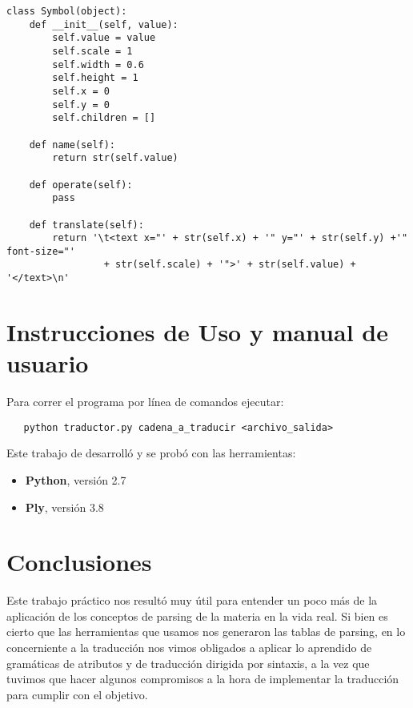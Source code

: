 \begin{verbatim}
class Symbol(object):
    def __init__(self, value):
        self.value = value
        self.scale = 1
        self.width = 0.6
        self.height = 1
        self.x = 0
        self.y = 0
        self.children = []

    def name(self):
        return str(self.value)

    def operate(self):
        pass

    def translate(self):
        return '\t<text x="' + str(self.x) + '" y="' + str(self.y) +'" font-size="' 
                 + str(self.scale) + '">' + str(self.value) + '</text>\n'
\end{verbatim}


\newpage

\section{Instrucciones de Uso y manual de usuario}

\indent \indent Para correr el programa por línea de comandos ejecutar:\\
\begin{verbatim}
   python traductor.py cadena_a_traducir <archivo_salida>
\end{verbatim}

\indent Este trabajo de desarrolló y se probó con las herramientas:
\begin{itemize}
\item \textbf{Python}, versión 2.7
\item \textbf{Ply}, versión 3.8
\end{itemize}

\section{Conclusiones}

\indent Este trabajo práctico nos resultó muy útil para entender un poco más de la aplicación de los conceptos de parsing de la materia en la vida real. Si bien es cierto que las herramientas que usamos nos generaron las tablas de parsing, en lo concerniente a la traducción nos vimos obligados a aplicar lo aprendido de gramáticas de atributos y de traducción dirigida por sintaxis, a la vez que tuvimos que hacer algunos compromisos a la hora de implementar la traducción para cumplir con el objetivo.\\



